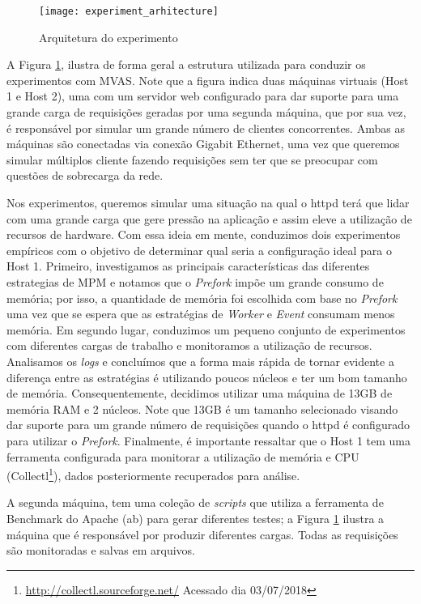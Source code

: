 \begin{figure}[!h] \centering
  \texttt{[image: experiment\_arhitecture]}
  \caption{Arquitetura do experimento} \label{fig:experiment_architecture}
\end{figure}

A Figura  \ref{fig:experiment_architecture}, ilustra de forma geral a estrutura
utilizada para conduzir os experimentos com MVAS. Note que a figura indica duas
máquinas virtuais (Host 1 e Host 2), uma com um servidor web configurado para
dar suporte para uma grande carga de requisições geradas por uma segunda
máquina, que por sua vez, é responsável por simular um grande número de
clientes concorrentes. Ambas as máquinas são conectadas via conexão Gigabit
Ethernet, uma vez que queremos simular múltiplos cliente fazendo requisições
sem ter que se preocupar com questões de sobrecarga da rede.

Nos experimentos, queremos simular uma situação na qual o httpd terá que
lidar com uma grande carga que gere pressão na aplicação e assim eleve a
utilização de recursos de hardware. Com essa ideia em mente, conduzimos
dois experimentos empíricos com o objetivo de determinar qual seria a
configuração ideal para o Host 1. Primeiro, investigamos as principais
características das diferentes estrategias de MPM e notamos que o
\emph{Prefork} impõe um grande consumo de memória; por isso, a quantidade de
memória foi escolhida com base no \emph{Prefork} uma vez que se espera que as
estratégias de \emph{Worker} e \emph{Event} consumam menos memória. Em segundo
lugar, conduzimos um pequeno conjunto de experimentos com diferentes cargas
de trabalho e monitoramos a utilização de recursos. Analisamos os \emph{logs} e concluímos que a forma mais rápida de tornar evidente a
diferença entre as estratégias é utilizando poucos núcleos e ter um bom
tamanho de memória. Consequentemente, decidimos utilizar uma máquina de
13GB de memória RAM e 2 núcleos. Note que 13GB é um tamanho selecionado visando
dar suporte para um grande número de requisições quando o httpd é configurado
para utilizar o \emph{Prefork}. Finalmente, é importante ressaltar que o Host 1
tem uma ferramenta configurada para monitorar a utilização de memória e CPU
(Collectl\footnote{\url{http://collectl.sourceforge.net/} Acessado dia 03/07/2018}),
dados posteriormente recuperados para análise.

A segunda máquina, tem uma coleção de \emph{scripts} que utiliza a ferramenta
de Benchmark do Apache (ab) para gerar diferentes testes; a Figura
\ref{fig:experiment_architecture} ilustra a máquina que é responsável por
produzir diferentes cargas. Todas as requisições são monitoradas e salvas em
arquivos.

